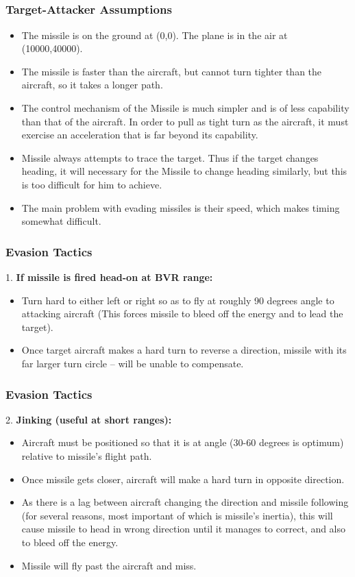 \documentclass{beamer}
\begin{document}
\subsection{} 
\begin{frame}
\frametitle{Target-Attacker Assumptions}

\begin{itemize}
	\item The missile is on the ground at (0,0). The plane is in the air at (10000,40000).
	\item The missile is faster than the aircraft, but cannot turn tighter than the aircraft, so it takes a longer path.
	\item The control mechanism of the Missile is much simpler and is of less capability than that of the aircraft. In order to pull as tight turn as the aircraft, it must exercise an acceleration that is far beyond its capability.
	\item Missile always attempts to trace the target. Thus if the target changes heading, it will necessary for the Missile to change heading similarly, but this is too difficult for him to achieve.
	\item  The main problem with evading missiles is their speed, which makes timing somewhat difficult.
\end{itemize}
\end{frame}
\begin{frame}
\frametitle{Evasion Tactics}
1. \textbf{If missile is fired head-on at BVR range:}
	\begin{itemize}
		\item Turn hard to either left or right so as to fly at roughly 90 degrees angle to attacking aircraft (This forces missile to bleed off the energy and to lead the target).
		\item Once target aircraft makes a hard turn to reverse a direction, missile with its far larger turn circle – will be unable to compensate.
	\end{itemize}
\end{frame}
\begin{frame}
\frametitle{Evasion Tactics}
2. \textbf{ Jinking (useful at short ranges):}
	\begin{itemize}
		\item Aircraft must be positioned so that it is at angle (30-60 degrees is optimum) relative to missile’s flight path.
		\item Once missile gets closer, aircraft will make a hard turn in opposite direction.
		\item As there is a lag between aircraft changing the direction and missile following (for several reasons, most important of which is missile’s inertia), this will cause missile to head in wrong direction until it manages to correct, and also to bleed off the energy.
		\item Missile will fly past the aircraft and miss.
	\end{itemize}
\end{frame}
\end{document}
